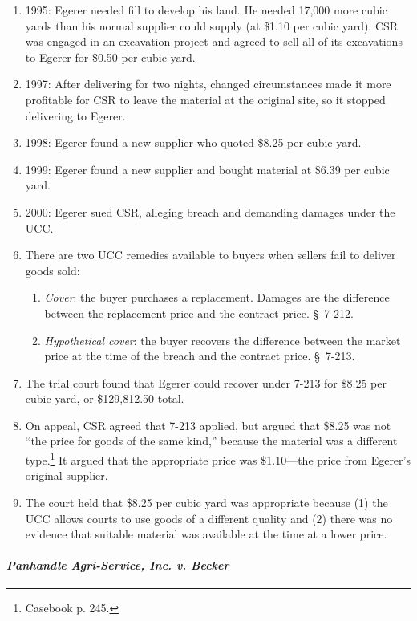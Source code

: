 \begin{enumerate}
    \item 1995: Egerer needed fill to develop his land. He needed 17,000 more 
    cubic yards than his normal supplier could supply (at \$1.10 per cubic 
    yard). CSR was engaged in an excavation project and agreed to sell all of 
    its excavations to Egerer for \$0.50 per cubic yard.
    \item 1997: After delivering for two nights, changed circumstances made it 
    more profitable for CSR to leave the material at the original site, so it 
    stopped delivering to Egerer.
    \item 1998: Egerer found a new supplier who quoted \$8.25 per cubic yard.
    \item 1999: Egerer found a new supplier and bought material at \$6.39 per 
    cubic yard.
    \item 2000: Egerer sued CSR, alleging breach and demanding damages under 
    the UCC.
    \item There are two UCC remedies available to buyers when sellers fail to 
    deliver goods sold:
    \begin{enumerate}
        \item \emph{Cover}: the buyer purchases a replacement. Damages are the 
        difference between the replacement price and the contract price. \S\ 
        7-212.
        \item \emph{Hypothetical cover}: the buyer recovers the difference 
        between the market price at the time of the breach and the contract 
        price. \S\ 7-213.
    \end{enumerate}
    \item The trial court found that Egerer could recover under 7-213 for 
    \$8.25 per cubic yard, or \$129,812.50 total.
    \item On appeal, CSR agreed that 7-213 applied, but argued that \$8.25 was 
    not ``the price for goods of the same kind,'' because the material was a 
    different type.\footnote{Casebook p. 245.} It argued that the appropriate 
    price was \$1.10---the price from Egerer's original supplier.
    \item The court held that \$8.25 per cubic yard was appropriate because 
    (1) the UCC allows courts to use goods of a different quality and (2) 
    there was no evidence that suitable material was available at the time at 
    a lower price.
\end{enumerate}

\paragraph{\emph{Panhandle Agri-Service, Inc. v. Becker}}

